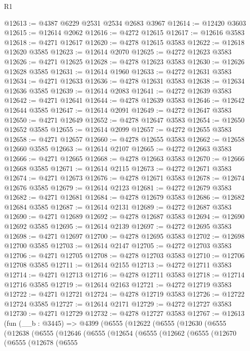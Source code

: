 \begin{lexlean}{R1}
\begin{coremodule}
@12613 := @4387 @6229 @2531 @2534 @2683 @3967
@12614 := @12420 @3603
@12615 := @12614 @2062
@12616 := @4272 @12615
@12617 := @12616 @3583
@12618 := @4271 @12617
@12620 := @4278 @12615 @3583
@12622 := @12618 @12620 @3585
@12623 := @12614 @2070
@12625 := @4272 @12623 @3583
@12626 := @4271 @12625
@12628 := @4278 @12623 @3583
@12630 := @12626 @12628 @3585
@12631 := @12614 @1960
@12633 := @4272 @12631 @3583
@12634 := @4271 @12633
@12636 := @4278 @12631 @3583
@12638 := @12634 @12636 @3585
@12639 := @12614 @2083
@12641 := @4272 @12639 @3583
@12642 := @4271 @12641
@12644 := @4278 @12639 @3583
@12646 := @12642 @12644 @3585
@12647 := @12614 @2091
@12649 := @4272 @12647 @3583
@12650 := @4271 @12649
@12652 := @4278 @12647 @3583
@12654 := @12650 @12652 @3585
@12655 := @12614 @2099
@12657 := @4272 @12655 @3583
@12658 := @4271 @12657
@12660 := @4278 @12655 @3583
@12662 := @12658 @12660 @3585
@12663 := @12614 @2107
@12665 := @4272 @12663 @3583
@12666 := @4271 @12665
@12668 := @4278 @12663 @3583
@12670 := @12666 @12668 @3585
@12671 := @12614 @2115
@12673 := @4272 @12671 @3583
@12674 := @4271 @12673
@12676 := @4278 @12671 @3583
@12678 := @12674 @12676 @3585
@12679 := @12614 @2123
@12681 := @4272 @12679 @3583
@12682 := @4271 @12681
@12684 := @4278 @12679 @3583
@12686 := @12682 @12684 @3585
@12687 := @12614 @2131
@12689 := @4272 @12687 @3583
@12690 := @4271 @12689
@12692 := @4278 @12687 @3583
@12694 := @12690 @12692 @3585
@12695 := @12614 @2139
@12697 := @4272 @12695 @3583
@12698 := @4271 @12697
@12700 := @4278 @12695 @3583
@12702 := @12698 @12700 @3585
@12703 := @12614 @2147
@12705 := @4272 @12703 @3583
@12706 := @4271 @12705
@12708 := @4278 @12703 @3583
@12710 := @12706 @12708 @3585
@12711 := @12614 @2155
@12713 := @4272 @12711 @3583
@12714 := @4271 @12713
@12716 := @4278 @12711 @3583
@12718 := @12714 @12716 @3585
@12719 := @12614 @2163
@12721 := @4272 @12719 @3583
@12722 := @4271 @12721
@12724 := @4278 @12719 @3583
@12726 := @12722 @12724 @3585
@12727 := @12614 @2171
@12729 := @4272 @12727 @3583
@12730 := @4271 @12729
@12732 := @4278 @12727 @3583
@12767 := @12613
    (fun (__b : @3445) =>
    @4399
      (@6555
        (@12622
          (@6555
            (@12630
              (@6555
                (@12638
                  (@6555
                    (@12646
                      (@6555
                        (@12654
                          (@6555
                            (@12662
                              (@6555
                                (@12670
                                  (@6555
                                    (@12678
                                      (@6555

\end{coremodule}
\end{lexlean}
